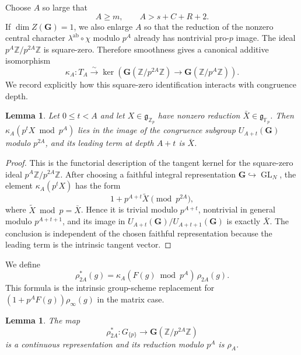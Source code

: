 \documentclass[11pt]{amsart}
\numberwithin{equation}{section}
\newcommand{\Z}{\mathbb Z}
\newcommand{\Fp}{\mathbb F_p}
\newcommand{\Zp}{\mathbb Z_p}
\newcommand{\frakg}{\mathfrak g}
\newcommand{\GG}{\mathbf G}
\newcommand{\GL}{\operatorname{GL}}
\newtheorem{lemma}[theorem]{Lemma}
\theoremstyle{definition}
\begin{document}
Choose $A$ so large that
\begin{equation}\label{eq:A-choice}
        A\ge m,
        \qquad
        A>s+C+R+2.
\end{equation}
If $\dim Z(\GG)=1$, we also enlarge $A$ so that the reduction of the
nonzero central character $\lambda^{\mathrm{ab}}\circ\chi$ modulo
$p^A$ already has nontrivial pro-$p$ image. The ideal $p^A\Z/p^{2A}\Z$ is square-zero. Therefore smoothness gives
a canonical additive isomorphism
\begin{equation}\label{eq:kappa-A}
 \kappa_A:T_A
 \xrightarrow{\sim}
 \ker\!\left(\GG(\Z/p^{2A}\Z)
       \to\GG(\Z/p^A\Z)\right).
\end{equation}
We record explicitly how this square-zero identification interacts with
congruence depth.

\begin{lemma}\label{lem:kappa-depth}
Let $0\le t<A$ and let $X\in\frakg_{\Zp}$ have nonzero reduction
$\bar X\in\frakg_{\Fp}$.  Then
$\kappa_A(p^tX\bmod p^A)$ lies in the image of the congruence subgroup
$U_{A+t}(\GG)$ modulo $p^{2A}$, and its leading term at depth $A+t$
is $\bar X$.
\end{lemma}

\begin{proof}
This is the functorial description of the tangent kernel for the
square-zero ideal $p^A\Z/p^{2A}\Z$.  After choosing a faithful
integral representation $\GG\hookrightarrow\GL_N$, the element
$\kappa_A(p^tX)$ has the form
\[
        1+p^{A+t}\widetilde X
        \pmod{p^{2A}},
\]
where $\widetilde X\bmod p=\bar X$.  Hence it is trivial modulo
$p^{A+t}$, nontrivial in general modulo $p^{A+t+1}$, and its image in
$U_{A+t}(\GG)/U_{A+t+1}(\GG)$ is exactly $\bar X$.  The conclusion
is independent of the chosen faithful representation because the
leading term is the intrinsic tangent vector.
\end{proof}

We define
\begin{equation}\label{eq:rho-2A}
 \rho_{2A}^*(g)
 =\kappa_A(F(g)\bmod p^A)\,\rho_{2A}(g).
\end{equation}
This formula is the intrinsic group-scheme replacement for
$(1+p^AF(g))\rho_\infty(g)$ in the matrix case.

\begin{lemma}\label{lem:initial-twist-rep}
The map
\[
        \rho_{2A}^*:G_{\{p\}}
        \longrightarrow\GG(\Z/p^{2A}\Z)
\]
is a continuous representation and its reduction modulo $p^A$ is
$\rho_A$.
\end{lemma}
\end{document}
